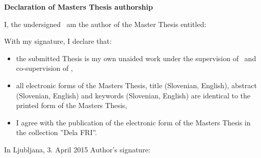 \vspace*{1cm}
\begin{center}
{\Large \textbf{\sc Declaration of Masters Thesis authorship}}
\end{center}

\vspace{1cm}
\noindent I, the undersigned \myname\ am the author of the Master Thesis entitled:

\vspace{0.5cm}
\begin{center}
\emph{\mytitle}
\end{center}

\vspace{1cm}
\noindent With my signature, I declare that:
\begin{itemize}
	\item the submitted Thesis is my own unaided work under the supervision of \mysupervisor\ and co-supervision of \mycosupervisor,

	\item all electronic forms of the Masters Thesis, title (Slovenian, English), abstract (Slovenian, English) and keywords (Slovenian, English) are identical to the printed form of the Masters Thesis,
	\item I agree with the publication of the electronic form of the Masters Thesis in the collection ''Dela FRI''. 
\end{itemize}

\vspace{1cm}
\noindent In Ljubljana, 3. April 2015 \hfill Author's signature: